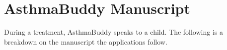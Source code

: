 \chapter{AsthmaBuddy Manuscript}
\label{chp:newanuscript}
During a treatment, AsthmaBuddy speaks to a child. The following is a breakdown on the manuscript the applications follow.